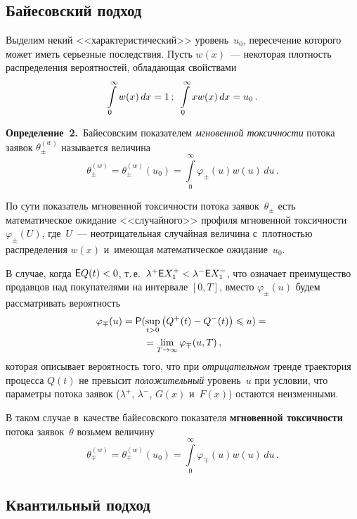 \begin{multicols}{2}
\subsection{Байесовский подход}

Выделим некий <<характеристический>> уровень~$u_0$, пересечение
которого может иметь серьезные последствия. Пусть $w(x)$~---
некоторая плотность распределения вероятностей, обла\-да\-ющая
свойствами
\begin{equation}
\label{eq:evcond}
\int\limits_{0}^{\infty}w(x)\,dx=1\,;\enskip
\int\limits_{0}^{\infty}xw(x)\,dx=u_0\,.
\end{equation}

\noindent
\textbf{Определение~2.}\
Байесовским показателем
\textit{мгновенной токсичности} потока заявок $\theta_{\pm}^{(w)}$
называется величина
$$
\theta_{\pm}^{(w)}=\theta_{\pm}^{(w)}(u_0)=
\int\limits_{0}^{\infty}\varphi_{\pm}(u)w(u)\,du\,.
$$


По сути показатель мгновенной токсичности потока заявок~$\theta_{\pm}$
есть математическое ожидание <<случайного>> профиля
мгновенной токсичности $\varphi_{\pm}(U)$, где~$U$~--- неотрицательная
случайная величина с~плотностью распределения $w(x)$ и~имеющая
математическое ожидание~$u_0$.

В случае, когда $\Esf Q(t) \hm< 0$, т.\,е.\ $\lambda^+ \Esf X_1^+ \hm< \lambda^-
\Esf X_1^-$, что означает преимущество продавцов над покупателями на
интервале $[0, T]$, вместо $\varphi_{\pm}(u)$ будем рассматривать
вероятность
\begin{multline*}
\varphi_{\mp}(u) = {\sf P}(\sup\limits_{t > 0} \left( Q^+(t) - Q^-(t) \right) \leqslant u)
= {}\\
{}=\lim\limits_{T \to \infty} \varphi_{\mp}(u, T)\,,
\end{multline*}
которая описывает вероятность того, что при {\it отрицательном}
тренде траектория процесса $Q(t)$ не превысит {\it положительный}
уровень~$u$ при условии, что параметры потока заявок ($\lambda^+$,
$\lambda^-$, $G(x)$ и~$F(x)$) остаются неизменными.

В таком случае в~качестве байесовского показателя \textbf{мгновенной
токсичности} потока заявок~$\theta$ возьмем величину
$$
\theta_{\mp}^{(w)}=\theta_{\mp}^{(w)}(u_0)=\int\limits_{0}^{\infty}\varphi_{\mp}(u)w(u)\,du\,.
$$

\subsection{Квантильный подход}


\end{multicols}
